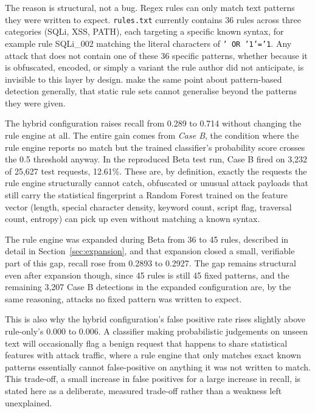 \documentclass{llncs}
\begin{document}
The reason is structural, not a bug. Regex rules can only match text
patterns they were written to expect. \texttt{rules.txt} currently
contains 36 rules across three categories (SQLi, XSS, PATH), each
targeting a specific known syntax, for example rule SQLi\_002 matching
the literal characters of \texttt{' OR '1'='1}. Any attack that does not
contain one of these 36 specific patterns, whether because it is
obfuscated, encoded, or simply a variant the rule author did not
anticipate, is invisible to this layer by design. \citep{durmuskaya2025}
make the same point about pattern-based detection generally, that
static rule sets cannot generalise beyond the patterns they were given.

The hybrid configuration raises recall from 0.289 to 0.714 without
changing the rule engine at all. The entire gain comes from
\emph{Case B}, the condition where the rule engine reports no match but
the trained classifier's probability score crosses the 0.5 threshold
anyway. In the reproduced Beta test run, Case B fired on 3{,}232 of
25{,}627 test requests, 12.61\%. These are, by definition, exactly the
requests the rule engine structurally cannot catch, obfuscated or
unusual attack payloads that still carry the statistical fingerprint a
Random Forest trained on the feature vector (length, special character
density, keyword count, script flag, traversal count, entropy) can
pick up even without matching a known syntax.

The rule engine was expanded during Beta from 36 to 45 rules, described
in detail in Section~\ref{sec:expansion}, and that expansion closed a
small, verifiable part of this gap, recall rose from 0.2893 to 0.2927.
The gap remains structural even after expansion though, since 45 rules
is still 45 fixed patterns, and the remaining 3{,}207 Case B detections
in the expanded configuration are, by the same reasoning, attacks no
fixed pattern was written to expect.

This is also why the hybrid configuration's false positive rate rises
slightly above rule-only's 0.000 to 0.006. A classifier making
probabilistic judgements on unseen text will occasionally flag a benign
request that happens to share statistical features with attack traffic,
where a rule engine that only matches exact known patterns essentially
cannot false-positive on anything it was not written to match. This
trade-off, a small increase in false positives for a large increase in
recall, is stated here as a deliberate, measured trade-off rather than
a weakness left unexplained.
\end{document}
